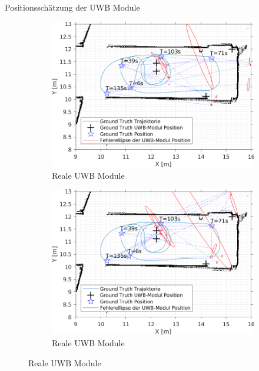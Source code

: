 \documentclass{beamer}
\begin{document}
%
% 
%
\begin{frame}{Positionsschätzung der UWB Module}

	\begin{figure}
		\centering
		\begin{subfigure}{0.4\linewidth}
			\centering
			\includegraphics[width=\linewidth]{Record_2018-02-08-12-33-53_filtered_3_beacon_error}
			\caption{Reale UWB Module}
		\end{subfigure}
		\hfill
		\begin{subfigure}{0.4\linewidth}
			\centering
			\includegraphics[width=\linewidth]{Record_2018-02-08-12-33-53_filtered_1_beacon_error}
			\caption{Reale UWB Module}
		\end{subfigure}

\end{figure}
\end{frame}
\end{document}
